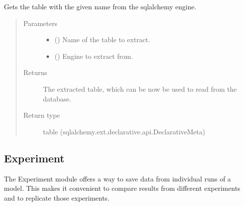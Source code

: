 \documentclass[letterpaper,10pt,english]{sphinxmanual}
\begin{document}

\begin{fulllineitems}
\label{\detokenize{Fireworks:Fireworks.extensions.database.reflect_table}}
Gets the table with the given name from the sqlalchemy engine.
\begin{quote}\begin{description}
\item[{Parameters}] \leavevmode\begin{itemize}
\item {} 
 () \textendash{} Name of the table to extract.

\item {} 
 () \textendash{} Engine to extract from.

\end{itemize}

\item[{Returns}] \leavevmode
The extracted table, which can be now be used to read from the database.

\item[{Return type}] \leavevmode
table (sqlalchemy.ext.declarative.api.DeclarativeMeta)

\end{description}\end{quote}

\end{fulllineitems}



\subsection{Experiment}
\label{\detokenize{Fireworks:experiment}}
The Experiment module offers a way to save data from individual runs of a model. This makes it convenient to compare results from different
experiments and to replicate those experiments.

%
\begin{sphinxVerbatim}[commandchars=\\\{\}]
    
\end{sphinxVerbatim}
\end{document}
